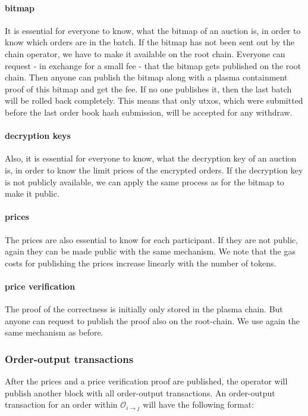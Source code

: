 \documentclass[11pt,parskip=full]{scrartcl}%
\def\pO{\mathcal{O}}
\def\ra{\rightarrow}
\begin{document}
\paragraph{bitmap}
It is essential for everyone to know, what the bitmap of an auction is, in order to know which orders are in the batch. 
If the bitmap has not been sent out by the chain operator, we have to make it available on the root chain. 
Everyone can request - in exchange for a small fee - that the bitmap gets published on the root chain. 
Then anyone can publish the bitmap along with a plasma containment proof of this bitmap and get the fee. 
If no one publishes it, then the last batch will be rolled back completely. 
This means that only utxos, which were submitted before the last order book hash submission, will be accepted for any withdraw. 

\paragraph{decryption keys}
Also, it is essential for everyone to know, what the decryption key of an auction is, in order to know the limit prices of the encrypted orders. 
If the decryption key is not publicly available, we can apply the same process as for the bitmap to make it public. 

\paragraph{prices}
The prices are also essential to know for each participant. 
If they are not public, again they can be made public with the same mechanism. 
We note that the gas costs for publishing the prices increase linearly with the number of tokens. 

\paragraph{price verification}
The proof of the correctness is initially only stored in the plasma chain. 
But anyone can request to publish the proof also on the root-chain. 
We use again the same mechanism as before. 


\subsubsection{Order-output transactions}
After the prices and a price verification proof are published, the operator will publish another block with all order-output transactions. 
An order-output transaction for an order within $\pO_{i\ra j}$ will have the following format:
\end{document}
